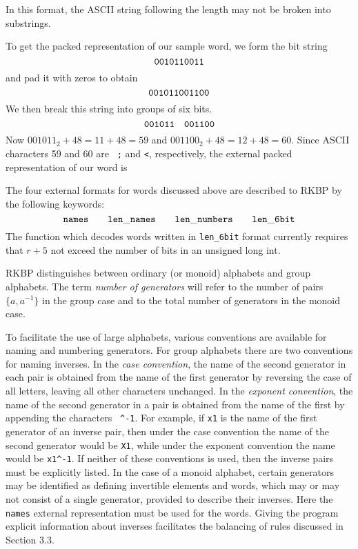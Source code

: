 \medskip
\noindent{}
\medskip

\noindent In this format, the ASCII string following the length may not be
broken into substrings.

To get the packed representation of our sample word, we form the bit
string
$${\tt 0010110011}$$
\noindent and pad it with zeros to obtain
$${\tt 001011001100}$$
\noindent We then break this string into groups of six bits.
$${\tt 001011\quad001100}$$
\noindent Now $001011_2+48 = 11+48 = 59$ and
$001100_2+48 = 12+48 =60$. Since ASCII characters 59 and 60 are {\tt
;} and {\tt <}, respectively, the external packed representation of
our word is

\medskip
\noindent{}
\medskip


The four external formats for words discussed above are described to
RKBP by the following keywords:
$${\tt names\qquad len\_names\qquad len\_numbers\qquad len\_6bit}$$
\noindent The function which decodes words written in {\tt len\_6bit}
format currently requires that $r+5$ not exceed the number of bits in an
unsigned long int.

RKBP distinguishes between ordinary (or monoid) alphabets and group
alphabets.  The term {\it number of generators\/} will refer to the
number of pairs $\{a,a^{-1}\}$ in the group case and to the total number of
generators in the monoid case.

To facilitate the use of large alphabets, various conventions are
available for naming and numbering generators.  For group alphabets
there are two conventions for naming inverses.  In the {\it case
convention\/}, the name of the second generator in each pair is
obtained from the name of the first generator by reversing the case of
all letters, leaving all other characters unchanged.  In the {\it
exponent convention\/}, the name of the second generator in a pair is
obtained from the name of the first by appending the characters {\tt
\^{ }-1}.  For example, if {\tt x1} is the name of the first generator of
an inverse pair, then under the case convention the name of the second
generator would be {\tt X1}, while under the exponent convention the
name would be {\tt x1\^{ }-1}.  If neither of these conventions is
used, then the inverse pairs must be explicitly listed.  In the case
of a monoid alphabet, certain generators may be identified as defining
invertible elements and words, which may or may not consist of a
single generator, provided to describe their inverses.  Here the {\tt
names} external representation must be used for the words.  Giving the
program explicit information about inverses facilitates the balancing
of rules discussed in Section 3.3.

